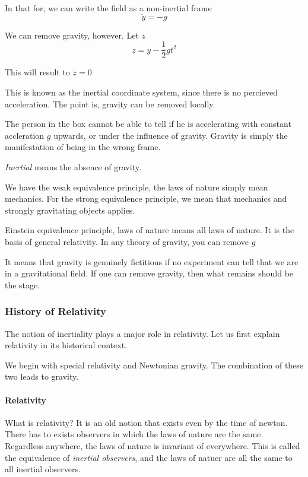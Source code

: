 		In that for, we can write the field as a non-inertial frame
		\begin{equation}
			\ddot{y} = -g
		\end{equation}

		We can remove gravity, however. Let $z$
		\begin{equation}
			z = y - \frac{1}{2}gt^2
		\end{equation}

		This will result to $\ddot z = 0$

		This is known as the inertial coordinate system, since there is no percieved acceleration. The point is,
		gravity can be removed locally.

		The person in the box cannot be able to tell if he is accelerating with constant accleration $g$ upwards,
		or under the influence of gravity. Gravity is simply the manifestation of being in the wrong frame.

		\textit{Inertial} means the absence of gravity.

		We have the weak equivalence principle, the laws of nature simply mean mechanics. For the strong equivalence principle, we mean that mechanics and
		strongly gravitating objects applies.

		Einstein equivalence principle, laws of nature means all laws of nature. It is the basis of general relativity.
		In any theory of gravity, you can remove $g$

		It means that gravity is genuinely fictitious if no experiment can tell that we are in a gravitational field.
		If one can remove gravity, then what remains should be the stage.

	\subsubsection{History of Relativity}
		The notion of inertiality plays a major role in relativity. Let us first explain relativity in its historical context.

		We begin with special relativity and Newtonian gravity. The combination of these two leads to gravity.

		\paragraph{Relativity} What is relativity? It is an old notion that exists even by the time of newton. There has to exists
		observers in which the laws of nature are the same. Regardless anywhere, the laws of nature is invariant of everywhere.
		This is called the equivalence of \textit{inertial observers}, and the laws of natuer are all the same to all inertial observers.

